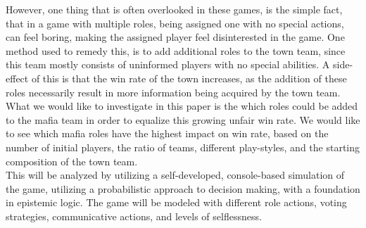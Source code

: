 However, one thing that is often overlooked in these games, is the simple fact, 
that in a game with multiple roles, being assigned one with no special actions, can 
feel boring, making the assigned player feel disinterested in the game. One 
method used to remedy this, is to add additional roles to the town team, since 
this team mostly consists of uninformed players with no special abilities. A 
side-effect of this is that the win rate of the town increases, as the addition 
of these roles necessarily result in more information being acquired by the 
town team. What we would like to investigate in this paper is the which roles 
could be added to the mafia team in order to equalize this growing unfair win 
rate. We would like to see which mafia roles have the highest impact on win 
rate, based on the number of initial players, the ratio of teams, different 
play-styles, and the starting composition of the town team. \\
This will be analyzed by utilizing a self-developed, console-based simulation 
of the game, utilizing a probabilistic approach to decision making, with a 
foundation in epistemic logic. The game will be modeled with different role 
actions, voting strategies, communicative actions, and levels of selflessness.